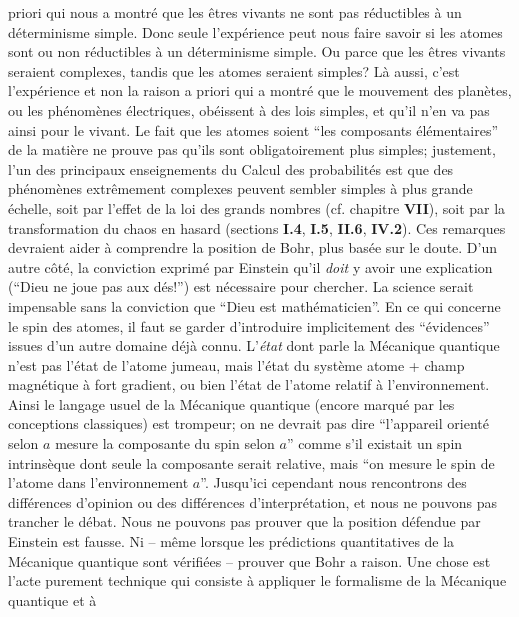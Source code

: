 priori qui nous a montr\'e que les \^etres vivants ne sont pas r\'eductibles
\`a un d\'eterminisme simple. Donc seule l'exp\'erience peut nous faire
savoir si les atomes sont ou non r\'eductibles \`a un d\'eterminisme
simple. Ou parce que les \^etres vivants seraient complexes, tandis que
les atomes seraient simples?  L\`a aussi, c'est l'exp\'erience et non la
raison a priori qui a montr\'e  que le mouvement des plan\`etes, ou les
ph\'enom\`enes \'electriques, ob\'eissent \`a des lois simples, et qu'il
n'en va pas ainsi pour le vivant. Le fait que les atomes soient ``les
composants \'el\'ementaires'' de la  mati\`ere ne prouve pas qu'ils sont
obligatoirement plus simples; justement, l'un des principaux
enseignements du Calcul des probabilit\'es est que des ph\'enom\`enes
extr\^emement complexes peuvent sembler simples \`a plus grande
\'echelle, soit par l'effet de la loi des grands nombres (cf. chapitre {\bf
VII}), soit par la transformation du chaos en hasard (sections {\bf I.4},
{\bf I.5}, {\bf II.6}, {\bf IV.2}).
\medskip
Ces remarques devraient aider \`a comprendre la position de Bohr, plus
bas\'ee sur le doute. D'un autre c\^ot\'e, la conviction exprim\'e  par
Einstein qu'il {\it doit} y avoir une explication (``Dieu ne joue pas aux
d\'es!'') est  n\'ecessaire pour chercher. La science serait impensable
sans  la conviction que ``Dieu est math\'ematicien''.
\medskip   
En ce qui concerne le spin des atomes, il faut se garder d'introduire
implicitement des  ``\'evidences'' issues d'un autre domaine d\'ej\`a connu.
L'{\it \'etat} dont parle la M\'ecanique quantique n'est pas l'\'etat de 
l'atome jumeau,  mais l'\'etat du syst\`eme atome + champ magn\'etique
\`a fort gradient, ou bien l'\'etat de l'atome relatif \`a l'environnement.
Ainsi le langage usuel de la M\'ecanique quantique (encore marqu\'e  par
les conceptions classiques) est trompeur; on ne devrait pas dire
``l'appareil orient\'e  selon $a$ mesure la composante du spin selon $a$''
comme s'il existait  un spin intrins\`eque  dont seule la composante
serait relative, mais ``on mesure le spin de l'atome dans   
l'environnement $a$''. 
\medskip  
Jusqu'ici cependant nous rencontrons des diff\'erences d'opinion 
ou des dif\-f\'e\-rences d'inter\-pr\'e\-ta\-tion, et nous ne pouvons pas  
trancher le  d\'ebat. Nous ne pouvons pas prouver que la position 
d\'efendue par Einstein est fausse. Ni -- m\^eme lorsque les  
pr\'edictions quantitatives de la M\'ecanique quantique sont v\'erifi\'ees 
-- prouver que Bohr a raison. Une chose est l'acte purement technique qui 
consiste \`a appliquer le formalisme de la M\'ecanique quantique et \`a 
